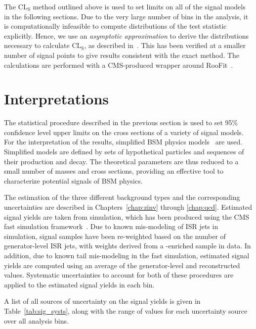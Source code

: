 The $\text{CL}_\text{S}$ method outlined above is used to set limits on all of the signal models in the following
sections. Due to the very large number of bins in the \mttwo analysis, it is computationally infeasible
to compute distributions of the test statistic explicitly. Hence, we use an \textit{asymptotic approximation} to
derive the distributions necessary to calculate $\text{CL}_\text{S}$, as described in~\cite{Cowan:asymptotic}.
This has been verified at a smaller number of signal points to give results consistent with the exact method.
The calculations are performed with a CMS-produced wrapper around RooFit~\cite{roofit}.

\section{Interpretations}
\label{sec:interp}

The statistical procedure described in the previous section is used to set 95\% confidence level upper limits
on the cross sections of a variety of signal models. 
For the interpretation of the results, simplified BSM physics models~\cite{Alwall:sms,Alwall:jetmet,Alves:sms} are used. 
Simplified models are defined by sets of hypothetical particles and sequences of their production
and decay. The theoretical parameters are thus reduced to a small number of masses and cross
sections, providing an effective tool to characterize potential signals of BSM physics.

The estimation of the three different background types
and the corresponding uncertainties are described in Chapters~\ref{chap:zinv} through \ref{chap:qcd}.
Estimated signal yields are taken from simulation, which has been produced using the CMS fast simulation
framework~\cite{CMS:fastsim}. Due to known mis-modeling of ISR jets in simulation, signal samples
have been re-weighted based on the number of generator-level ISR jets, with weights derived from a
\ttbar-enriched sample in data. In addition, due to known \ptmiss tail mis-modeling in the fast simulation,
estimated signal yields are computed using an average of the generator-level and reconstructed \ptmiss
values. Systematic uncertainties to account for both of these procedures are applied to the estimated
signal yields in each bin.

A list of all sources of uncertainty on the signal yields is given in Table~\ref{tab:sig_systs}, along
with the range of values for each uncertainty source over all analysis bins.

